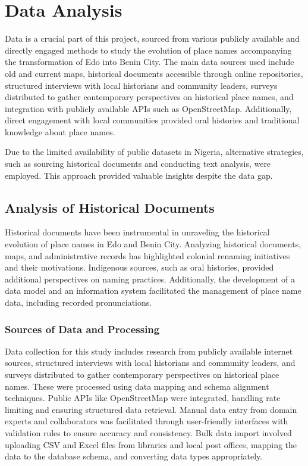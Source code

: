 \chapter{Data Analysis}
Data is a crucial part of this project, sourced from various publicly available and directly engaged methods to study the evolution of place names accompanying the transformation of Edo into Benin City. The main data sources used include old and current maps, historical documents accessible through online repositories, structured interviews with local historians and community leaders, surveys distributed to gather contemporary perspectives on historical place names, and integration with publicly available APIs such as OpenStreetMap. Additionally, direct engagement with local communities provided oral histories and traditional knowledge about place names.

Due to the limited availability of public datasets in Nigeria, alternative strategies, such as sourcing historical documents and conducting text analysis, were employed. This approach provided valuable insights despite the data gap.

\section{Analysis of Historical Documents}

Historical documents have been instrumental in unraveling the historical evolution of place names in Edo and Benin City. Analyzing historical documents, maps, and administrative records has highlighted colonial renaming initiatives and their motivations. Indigenous sources, such as oral histories, provided additional perspectives on naming practices. Additionally, the development of a data model and an information system facilitated the management of place name data, including recorded pronunciations.

\subsection{Sources of Data and Processing}

Data collection for this study includes research from publicly available internet sources, structured interviews with local historians and community leaders, and surveys distributed to gather
contemporary perspectives on historical place names. These were processed using data mapping and schema alignment techniques. Public APIs like OpenStreetMap were integrated, handling rate limiting and ensuring structured data retrieval. Manual data entry from domain experts and collaborators was facilitated through user-friendly interfaces with validation rules to ensure accuracy and consistency. Bulk data import involved uploading CSV and Excel files from libraries and local post offices, mapping the data to the database schema, and converting data types appropriately.

